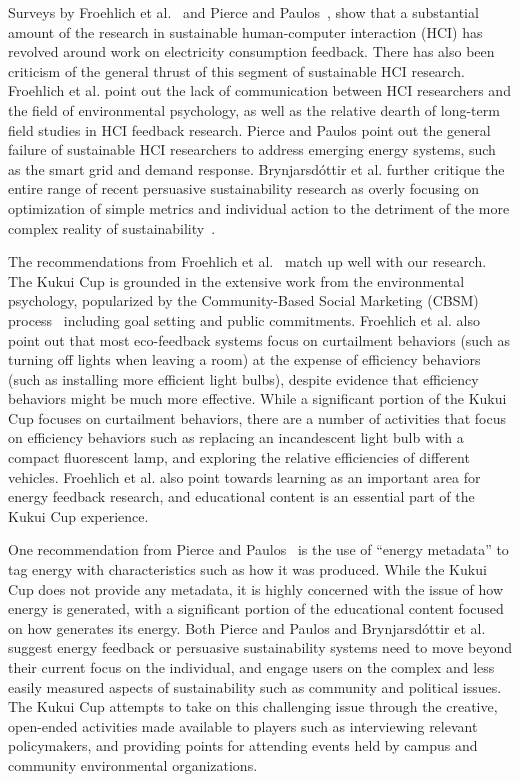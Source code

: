Surveys by Froehlich et al.~\cite{Froehlich2010} and Pierce and Paulos~\cite{Pierce2012-BEM}, show that a substantial amount of the research in sustainable human-computer interaction (HCI) has revolved around work on electricity consumption feedback. There has also been criticism of the general thrust of this segment of sustainable HCI research. Froehlich et al. point out the lack of communication between HCI researchers and the field of environmental psychology, as well as the relative dearth of long-term field studies in HCI feedback research. Pierce and Paulos point out the general failure of sustainable HCI researchers to address emerging energy systems, such as the smart grid and demand response. Brynjarsd\'{o}ttir et al. further critique the entire range of recent persuasive sustainability research as overly focusing on optimization of simple metrics and individual action to the detriment of the more complex reality of sustainability~\cite{Brynjarsdottir2012-unpersuaded}.

The recommendations from Froehlich et al.~\cite{Froehlich2010} match up well with our research. The Kukui Cup is grounded in the extensive work from the environmental psychology, popularized by the Community-Based Social Marketing (CBSM) process~\cite{McKenzie-Mohr2009} including goal setting and public commitments. Froehlich et al. also point out that most eco-feedback systems focus on curtailment behaviors (such as turning off lights when leaving a room) at the expense of efficiency behaviors (such as installing more efficient light bulbs), despite evidence that efficiency behaviors might be much more effective. While a significant portion of the Kukui Cup focuses on curtailment behaviors, there are a number of activities that focus on efficiency behaviors such as replacing an incandescent light bulb with a compact fluorescent lamp, and exploring the relative efficiencies of different vehicles. Froehlich et al. also point towards learning as an important area for energy feedback research, and educational content is an essential part of the Kukui Cup experience.

One recommendation from Pierce and Paulos~\cite{Pierce2012-BEM} is the use of ``energy metadata'' to tag energy with characteristics such as how it was produced. While the Kukui Cup does not provide any metadata, it is highly concerned with the issue of how energy is generated, with a significant portion of the educational content focused on how \Hawaii generates its energy. Both Pierce and Paulos and Brynjarsd\'{o}ttir et al. suggest energy feedback or persuasive sustainability systems need to move beyond their current focus on the individual, and engage users on the complex and less easily measured aspects of sustainability such as community and political issues. The Kukui Cup attempts to take on this challenging issue through the creative, open-ended activities made available to players such as interviewing relevant policymakers, and providing points for attending events held by campus and community environmental organizations.

